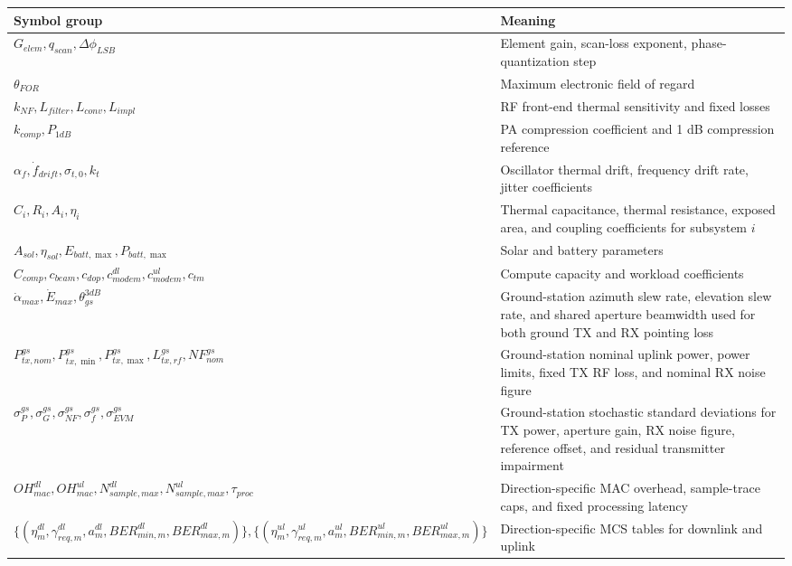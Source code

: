 \documentclass[11pt]{article}
\begin{document}
\begin{longtable}{p{} p{}}
\toprule
Symbol group & Meaning \\
\midrule
\endhead
$G_{elem}, q_{scan}, \Delta \phi_{LSB}$ & Element gain, scan-loss exponent, phase-quantization step \\
$\theta_{FOR}$ & Maximum electronic field of regard \\
$k_{NF}, L_{filter}, L_{conv}, L_{impl}$ & RF front-end thermal sensitivity and fixed losses \\
$k_{comp}, P_{1dB}$ & PA compression coefficient and 1 dB compression reference \\
$\alpha_f, \dot{f}_{drift}, \sigma_{t,0}, k_t$ & Oscillator thermal drift, frequency drift rate, jitter coefficients \\
$C_i, R_i, A_i, \eta_i$ & Thermal capacitance, thermal resistance, exposed area, and coupling coefficients for subsystem $i$ \\
$A_{sol}, \eta_{sol}, E_{batt,\max}, P_{batt,\max}$ & Solar and battery parameters \\
$C_{comp}, c_{beam}, c_{dop}, c^{dl}_{modem}, c^{ul}_{modem}, c_{tm}$ & Compute capacity and workload coefficients \\
$\dot{\alpha}_{max}, \dot{E}_{max}, \theta^{3dB}_{gs}$ & Ground-station azimuth slew rate, elevation slew rate, and shared aperture beamwidth used for both ground TX and RX pointing loss \\
$P^{gs}_{tx,nom}, P^{gs}_{tx,\min}, P^{gs}_{tx,\max}, L^{gs}_{tx,rf}, NF^{gs}_{nom}$ & Ground-station nominal uplink power, power limits, fixed TX RF loss, and nominal RX noise figure \\
$\sigma^{gs}_{P}, \sigma^{gs}_{G}, \sigma^{gs}_{NF}, \sigma^{gs}_{f}, \sigma^{gs}_{EVM}$ & Ground-station stochastic standard deviations for TX power, aperture gain, RX noise figure, reference offset, and residual transmitter impairment \\
$OH^{dl}_{mac}, OH^{ul}_{mac}, N^{dl}_{sample,max}, N^{ul}_{sample,max}, \tau_{proc}$ & Direction-specific MAC overhead, sample-trace caps, and fixed processing latency \\
$\{(\eta^{dl}_m, \gamma^{dl}_{req,m}, a^{dl}_m, BER^{dl}_{min,m}, BER^{dl}_{max,m})\}, \{(\eta^{ul}_m, \gamma^{ul}_{req,m}, a^{ul}_m, BER^{ul}_{min,m}, BER^{ul}_{max,m})\}$ & Direction-specific MCS tables for downlink and uplink \\
\bottomrule
\end{longtable}
\end{document}
